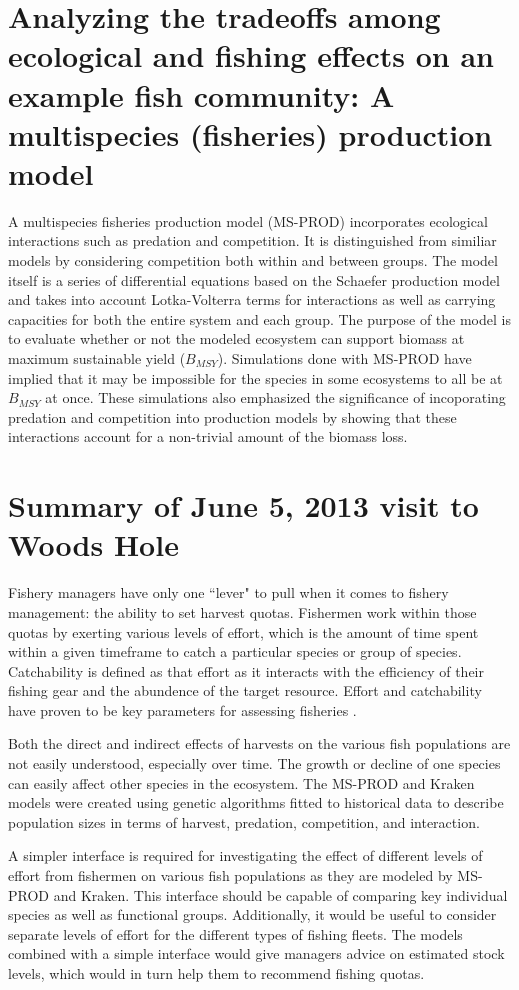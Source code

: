 \documentclass{article}
\begin{document}
\section{Analyzing the tradeoffs among ecological and fishing effects on an example fish community: A multispecies (fisheries) production model}

A multispecies fisheries production model (MS-PROD) \cite{Gamble20092570} incorporates ecological interactions such as predation and competition.  It is distinguished from similiar models by considering competition both within and between groups.  The model itself is a series of differential equations based on the Schaefer production model and takes into account Lotka-Volterra terms for interactions as well as carrying capacities for both the entire system and each group.  The purpose of the model is to evaluate whether or not the modeled ecosystem can support biomass at maximum sustainable yield ($B_{MSY}$).  Simulations done with MS-PROD have implied that it may be impossible for the species in some ecosystems to all be at $B_{MSY}$ at once.  These simulations also emphasized the significance of incoporating predation and competition into production models by showing that these interactions account for a non-trivial amount of the biomass loss.

\section{Summary of June 5, 2013 visit to Woods Hole}

Fishery managers have only one ``lever" to pull when it comes to fishery management: the ability to set harvest quotas.  Fishermen work within those quotas by exerting various levels of effort, which is the amount of time spent within a given timeframe to catch a particular species or group of species.  Catchability is defined as that effort as it interacts with the efficiency of their fishing gear and the abundence of the target resource.  Effort and catchability have proven to be key parameters for assessing fisheries \cite{Arreguín-Sánchez1996}. 

Both the direct and indirect effects of harvests on the various fish populations are not easily understood, especially over time.  The growth or decline of one species can easily affect other species in the ecosystem.  The MS-PROD and Kraken models were created using genetic algorithms fitted to historical data to describe population sizes in terms of harvest, predation, competition, and interaction.

A simpler interface is required for investigating the effect of different levels of effort from fishermen on various fish populations as they are modeled by MS-PROD and Kraken.  This interface should be capable of comparing key individual species as well as functional groups.  Additionally, it would be useful to consider separate levels of effort for the different types of fishing fleets.  The models combined with a simple interface would give managers advice on estimated stock levels, which would in turn help them to recommend fishing quotas.




\end{document}
